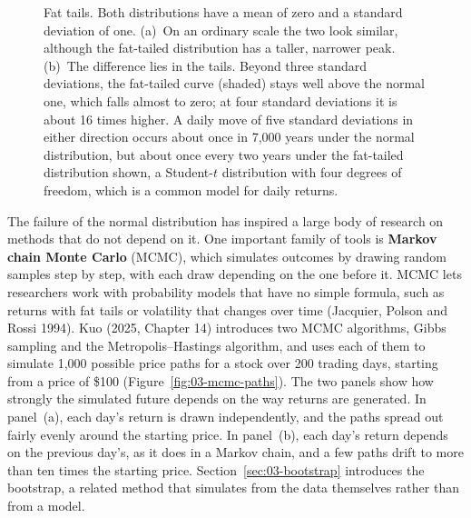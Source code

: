 \begin{figure}[!htbp]
  \caption{Fat tails. Both distributions have a mean of zero and a standard deviation of one. (a)~On an ordinary scale the two look similar, although the fat-tailed distribution has a taller, narrower peak. (b)~The difference lies in the tails. Beyond three standard deviations, the fat-tailed curve (shaded) stays well above the normal one, which falls almost to zero; at four standard deviations it is about 16 times higher. A daily move of five standard deviations in either direction occurs about once in 7,000 years under the normal distribution, but about once every two years under the fat-tailed distribution shown, a Student-$t$ distribution with four degrees of freedom, which is a common model for daily returns.}
  \label{fig:03-tails}
\end{figure}



The failure of the normal distribution has inspired a large body of research on methods that do not depend on it. One important family of tools is \textbf{Markov chain Monte Carlo} (MCMC), which simulates outcomes by drawing random samples step by step, with each draw depending on the one before it. MCMC lets researchers work with probability models that have no simple formula, such as returns with fat tails or volatility that changes over time (Jacquier, Polson and Rossi 1994). Kuo (2025, Chapter 14) introduces two MCMC algorithms, Gibbs sampling and the Metropolis--Hastings algorithm, and uses each of them to simulate 1,000 possible price paths for a stock over 200 trading days, starting from a price of \$100 (Figure~\ref{fig:03-mcmc-paths}). The two panels show how strongly the simulated future depends on the way returns are generated. In panel~(a), each day's return is drawn independently, and the paths spread out fairly evenly around the starting price. In panel~(b), each day's return depends on the previous day's, as it does in a Markov chain, and a few paths drift to more than ten times the starting price. Section~\ref{sec:03-bootstrap} introduces the bootstrap, a related method that simulates from the data themselves rather than from a model.

